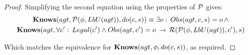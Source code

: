 \begin{proof}
Simplifying the second equation using the properties of $\mathcal{P}$ gives:\begin{multline*}
\mathbf{Knows}(agt,\mathcal{P}(\phi,LbU(agt)),do(c,s))\equiv\exists o:\, Obs(agt,c,s)=o\,\wedge\\
\mathbf{Knows}(agt,\forall c':\, Legal(c')\wedge Obs(agt,c')=o\,\rightarrow\,\mathcal{R}(\mathcal{P}(\phi,LbU(agt)),c'),s)\end{multline*}


Which matches the equivalence for $\mathbf{Knows}(agt,\phi,do(c,s))$, as required.
\end{proof}

